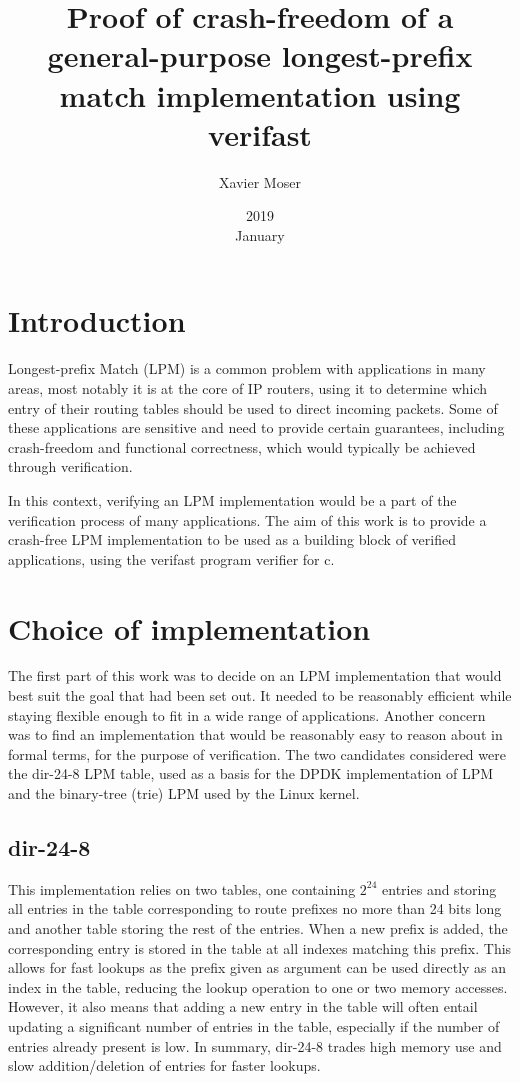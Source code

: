 \documentclass{article}
\title{Proof of crash-freedom of a general-purpose longest-prefix match implementation using verifast}
\date{2019\\ January}
\author{Xavier Moser}
\begin{document}
\maketitle
\section{Introduction}
Longest-prefix Match (LPM) is a common problem with applications in many areas, most notably it is at the
core of IP routers, using it to determine which entry of their routing tables should
be used to direct incoming packets. Some of these applications are sensitive and
need to provide certain guarantees, including crash-freedom and functional correctness,
which would typically be achieved through verification. \par
In this context, verifying an LPM implementation
would be a part of the verification process of many applications. The aim of this
work is to provide a crash-free LPM implementation to be used as a building block of
verified applications, using the verifast program verifier for c.
\section{Choice of implementation}
The first part of this work was to decide on an LPM implementation that would best
suit the goal that had been set out. It needed to be reasonably efficient while staying
flexible enough to fit in a wide range of applications. Another concern was to find
an implementation that would be reasonably easy to reason about in formal terms, for
the purpose of verification. The two candidates considered were the dir-24-8 LPM
table, used as a basis for the DPDK implementation of LPM and the binary-tree (trie)
LPM used by the Linux kernel.
\subsection{dir-24-8}
This implementation relies on two tables, one containing $2^{24}$ entries and storing
all entries in the table corresponding to route prefixes no more than 24 bits long
and another table storing the rest of the entries. When a new prefix is added, the
corresponding entry is stored in the table at all indexes matching this prefix. This
allows for fast lookups as the prefix given as argument can be used directly as an
index in the table, reducing the lookup operation to one or two memory accesses.
However, it also means that adding a new entry in the table will often entail updating
a significant number of entries in the table, especially if the number of entries
already present is low. In summary, dir-24-8 trades high memory use and slow
addition/deletion of entries for faster lookups.
\end{document}
